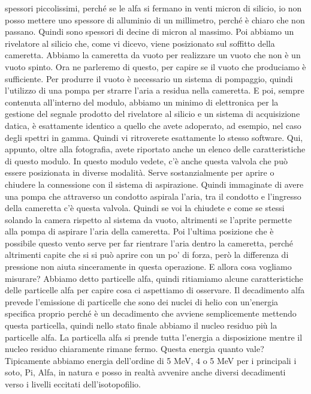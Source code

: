 spessori piccolissimi, perché se le alfa si fermano in venti micron di silicio, io non posso mettere uno spessore di alluminio di un millimetro, perché è chiaro che non passano. Quindi sono spessori di decine di micron al massimo. Poi abbiamo un rivelatore al silicio che, come vi dicevo, viene posizionato sul soffitto della cameretta. Abbiamo la cameretta da vuoto per realizzare un vuoto che non è un vuoto spinto. Ora ne parleremo di questo, per capire se il vuoto che produciamo è sufficiente. Per produrre il vuoto è necessario un sistema di pompaggio, quindi l'utilizzo di una pompa per strarre l'aria a residua nella cameretta. E poi, sempre contenuta all'interno del modulo, abbiamo un minimo di elettronica per la gestione del segnale prodotto del rivelatore al silicio e un sistema di acquisizione datica, è esattamente identico a quello che avete adoperato, ad esempio, nel caso degli spettri in gamma. Quindi vi ritroverete esattamente lo stesso software. Qui, appunto, oltre alla fotografia, avete riportato anche un elenco delle caratteristiche di questo modulo. In questo modulo vedete, c'è anche questa valvola che può essere posizionata in diverse modalità. Serve sostanzialmente per aprire o chiudere la connessione con il sistema di aspirazione. Quindi immaginate di avere una pompa che attraverso un condotto aspirala l'aria, tra il condotto e l'ingresso della cameretta c'è questa valvola. Quindi se voi la chiudete e come se stessi solando la camera rispetto al sistema da vuoto, altrimenti se l'aprite permette alla pompa di aspirare l'aria della cameretta. Poi l'ultima posizione che è possibile questo vento serve per far rientrare l'aria dentro la cameretta, perché altrimenti capite che si si può aprire con un po' di forza, però la differenza di pressione non aiuta sinceramente in questa operazione. E allora cosa vogliamo misurare? Abbiamo detto particelle alfa, quindi ritiamiamo alcune caratteristiche delle particelle alfa per capire cosa ci aspettiamo di osservare. Il decadimento alfa prevede l'emissione di particelle che sono dei nuclei di helio con un'energia specifica proprio perché è un decadimento che avviene semplicemente mettendo questa particella, quindi nello stato finale abbiamo il nucleo residuo più la particelle alfa. La particella alfa si prende tutta l'energia a disposizione mentre il nucleo residuo chiaramente rimane fermo. Questa energia quanto vale? Tipicamente abbiamo energia dell'ordine di 5 MeV, 4 o 5 MeV per i principali i soto, Pi, Alfa, in natura e posso in realtà avvenire anche diversi decadimenti verso i livelli eccitati dell'isotopofilio. 


